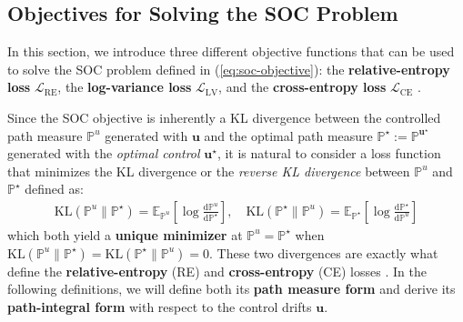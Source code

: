 \documentclass{article}
\newcommand{\boldtext}[1]{\textbf{\textcolor{MyGreen}{#1}}}
\begin{document}
\subsection{Objectives for Solving the SOC Problem}
\label{subsec:soc-objectives}
In this section, we introduce three different objective functions that can be used to solve the SOC problem defined in (\ref{eq:soc-objective}): the \textbf{relative-entropy loss} $\mathcal{L}_{\text{RE}}$, the \textbf{log-variance loss} $\mathcal{L}_{\text{LV}}$, and the \textbf{cross-entropy loss} $\mathcal{L}_{\text{CE}}$ \citep{nusken2021solving}. 

Since the SOC objective is inherently a KL divergence between the controlled path measure $\mathbb{P}^u$ generated with $\boldsymbol{u}$ and the optimal path measure $\mathbb{P}^\star:=\mathbb{P}^{\boldsymbol{u}^\star}$ generated with the \textit{optimal control} $\boldsymbol{u}^\star$, it is natural to consider a loss function that minimizes the KL divergence or the \textit{reverse KL divergence} between $\mathbb{P}^u$ and $\mathbb{P}^\star$ defined as:
\begin{align}
    \text{KL}(\mathbb{P}^u\|\mathbb{P}^\star)=\mathbb{E}_{\mathbb{P}^u}\left[\log \frac{\mathrm{d}\mathbb{P}^u}{\mathrm{d}\mathbb{P}^\star}\right], \quad \text{KL}(\mathbb{P}^\star\|\mathbb{P}^u)=\mathbb{E}_{\mathbb{P}^\star}\left[\log \frac{\mathrm{d}\mathbb{P}^\star}{\mathrm{d}\mathbb{P}^u}\right]
\end{align}
which both yield a \textbf{unique minimizer} at $\mathbb{P}^u=\mathbb{P}^\star$ when $\text{KL}(\mathbb{P}^u\|\mathbb{P}^\star)=\text{KL}(\mathbb{P}^\star\|\mathbb{P}^u)=0$. These two divergences are exactly what define the \boldtext{relative-entropy} (RE) and \boldtext{cross-entropy} (CE) losses \citep{nusken2021solving}. In the following definitions, we will define both its \textbf{path measure form} and derive its \textbf{path-integral form} with respect to the control drifts $\boldsymbol{u}$.
\end{document}
